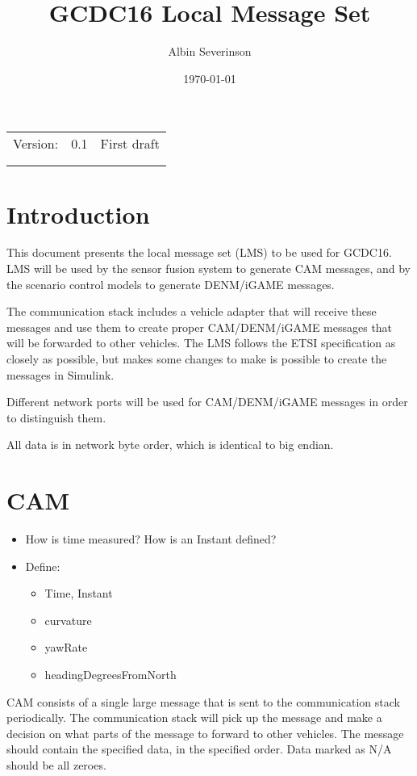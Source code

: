 \documentclass[11pt]{article}
\author{Albin Severinson}
\date{\today}
\title{GCDC16 Local Message Set}
\begin{document}
\maketitle
\tableofcontents

\begin{center}
\begin{tabular}{lrl}
Version: & 0.1 & First draft\\
 &  & \\
 &  & \\
\end{tabular}
\end{center}

\newpage
\section{Introduction}
\label{sec:orgheadline1}
This document presents the local message set (LMS) to be used for
GCDC16. LMS will be used by the sensor fusion system to generate CAM
messages, and by the scenario control models to generate DENM/iGAME
messages.

The communication stack includes a vehicle adapter that will receive
these messages and use them to create proper CAM/DENM/iGAME messages
that will be forwarded to other vehicles. The LMS follows the ETSI
specification as closely as possible, but makes some changes to make
is possible to create the messages in Simulink.

Different network ports will be used for CAM/DENM/iGAME messages in
order to distinguish them.

All data is in network byte order, which is identical to big endian.

\section{CAM}
\label{sec:orgheadline10}
\begin{itemize}
\item How is time measured? How is an Instant defined?
\item Define:
\begin{itemize}
\item Time, Instant
\item curvature
\item yawRate
\item headingDegreesFromNorth
\end{itemize}
\end{itemize}

CAM consists of a single large message that is sent to the
communication stack periodically. The communication stack will pick up
the message and make a decision on what parts of the message to forward
to other vehicles. The message should contain the specified data, in
the specified order. Data marked as N/A should be all zeroes.
\end{document}

